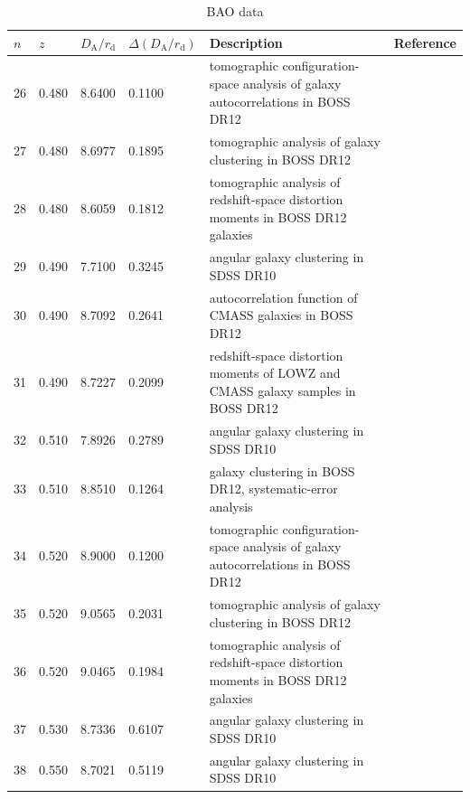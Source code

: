 \begin{table}
  \caption{BAO data}
  \label{tab:2a}
  \begin{tabular}{llllp{70mm}l}
    $n$ & $z$ & $D_\mathrm{A}/r_\mathrm{d}$ & $\Delta(D_\mathrm{A}/r_\mathrm{d})$ &
    Description & Reference \\
    \hline
    26 & 0.480 &  8.6400 & 0.1100 &
    tomographic configuration-space analysis of galaxy autocorrelations in BOSS DR12 &
    \cite{2017MNRAS.469.3762W} \\
    27 & 0.480 &  8.6977 & 0.1895 &
    tomographic analysis of galaxy clustering in BOSS DR12 &
    \cite{2018MNRAS.481.3160W} \\
    28 & 0.480 &  8.6059 & 0.1812 &
    tomographic analysis of redshift-space distortion moments in BOSS DR12 galaxies &
    \cite{2017MNRAS.466..762Z} \\
    29 & 0.490 &  7.7100 & 0.3245 &
    angular galaxy clustering in SDSS DR10 &
    \cite{2016PhRvD..93b3530C} \\
    30 & 0.490 &  8.7092 & 0.2641 &
    autocorrelation function of CMASS galaxies in BOSS DR12 &
    \cite{2016MNRAS.461.3781C} \\
    31 & 0.490 &  8.7227 & 0.2099 &
    redshift-space distortion moments of LOWZ and CMASS galaxy samples in BOSS DR12 &
    \cite{2017MNRAS.471.2370C} \\
    32 & 0.510 &  7.8926 & 0.2789 &
    angular galaxy clustering in SDSS DR10 &
    \cite{2016PhRvD..93b3530C} \\
    33 & 0.510 &  8.8510 & 0.1264 &
    galaxy clustering in BOSS DR12, systematic-error analysis &
    \cite{2018MNRAS.477.1153V} \\
    34 & 0.520 &  8.9000 & 0.1200 &
    tomographic configuration-space analysis of galaxy autocorrelations in BOSS DR12 &
    \cite{2017MNRAS.469.3762W} \\
    35 & 0.520 &  9.0565 & 0.2031 &
    tomographic analysis of galaxy clustering in BOSS DR12 &
    \cite{2018MNRAS.481.3160W} \\
    36 & 0.520 &  9.0465 & 0.1984 &
    tomographic analysis of redshift-space distortion moments in BOSS DR12 galaxies &
    \cite{2017MNRAS.466..762Z} \\
    37 & 0.530 &  8.7336 & 0.6107 &
    angular galaxy clustering in SDSS DR10 &
    \cite{2016PhRvD..93b3530C} \\
    38 & 0.550 &  8.7021 & 0.5119 &
    angular galaxy clustering in SDSS DR10 &
    \cite{2016PhRvD..93b3530C} \\

\end{tabular}
\end{table}
